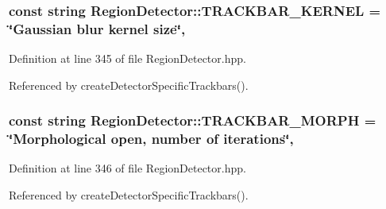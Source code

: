 \hypertarget{classmultiscale_1_1analysis_1_1RegionDetector_a79b72da59c92b368fb7894fe1f424e00}{
\subsubsection[{T\-R\-A\-C\-K\-B\-A\-R\-\_\-\-K\-E\-R\-N\-E\-L}]{\setlength{\rightskip}{0pt plus 5cm}const string Region\-Detector\-::\-T\-R\-A\-C\-K\-B\-A\-R\-\_\-\-K\-E\-R\-N\-E\-L = \char`\"{}Gaussian blur kernel size\char`\"{}\hspace{0.3cm}{\ttfamily [static]}, {\ttfamily [private]}}}\label{classmultiscale_1_1analysis_1_1RegionDetector_a79b72da59c92b368fb7894fe1f424e00}


Definition at line 345 of file Region\-Detector.\-hpp.



Referenced by create\-Detector\-Specific\-Trackbars().

\hypertarget{classmultiscale_1_1analysis_1_1RegionDetector_a0358affd40f13327b10447b7fe938338}{
\subsubsection[{T\-R\-A\-C\-K\-B\-A\-R\-\_\-\-M\-O\-R\-P\-H}]{\setlength{\rightskip}{0pt plus 5cm}const string Region\-Detector\-::\-T\-R\-A\-C\-K\-B\-A\-R\-\_\-\-M\-O\-R\-P\-H = \char`\"{}Morphological open, number of iterations\char`\"{}\hspace{0.3cm}{\ttfamily [static]}, {\ttfamily [private]}}}\label{classmultiscale_1_1analysis_1_1RegionDetector_a0358affd40f13327b10447b7fe938338}


Definition at line 346 of file Region\-Detector.\-hpp.



Referenced by create\-Detector\-Specific\-Trackbars().

